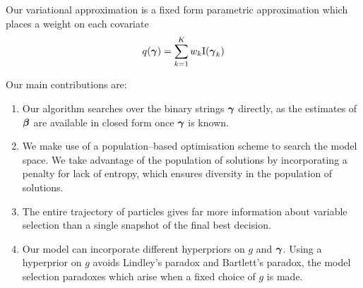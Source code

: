 Our variational approximation is a fixed form parametric approximation which places a weight on each covariate
\[
	q({\boldsymbol \gamma}) = \sum_{k=1}^K w_k \text{I}({\boldsymbol \gamma}_k)
\]


Our main contributions are:

\begin{enumerate}
	\item Our algorithm searches over the binary strings ${\boldsymbol \gamma}$ directly, as the estimates of ${\boldsymbol \beta}$ are available 
	in closed form once ${\boldsymbol \gamma}$ is known.

	\item We make use of a population--based optimisation scheme to search the model space. We take advantage of the
	population of solutions by incorporating a penalty for lack of entropy, which ensures diversity in the
	population of solutions.

	\item The entire trajectory of particles gives far more information about variable selection than a single
	snapshot of the final best decision.

	\item Our model can incorporate different hyperpriors on $g$ and ${\boldsymbol \gamma}$. Using a hyperprior on $g$
				avoids Lindley's paradox and Bartlett's paradox, the model selection paradoxes which arise when a
				fixed choice of $g$ is made.
\end{enumerate}





